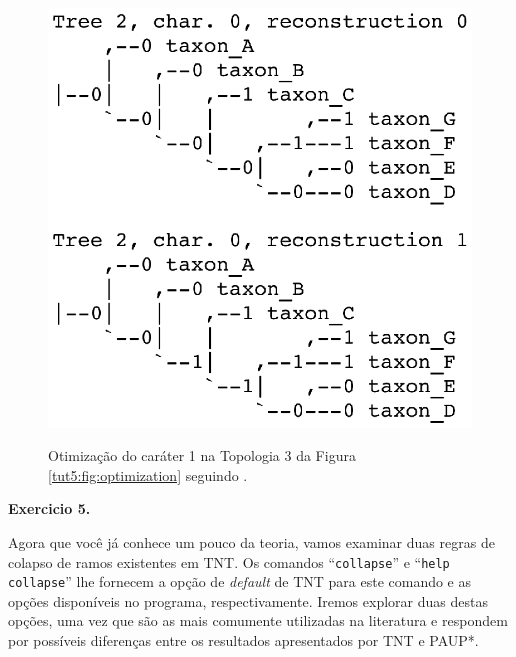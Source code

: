 \begin{refsection}
  \begin{figure}[H]
       \centering
      {\includegraphics[scale=0.70]{figures/tut5/reconstrucao_tnt.eps}}
	{\caption[\textcite{Coddington_and_Scharff_1994} reconstrução]{Otimização do caráter 1 na Topologia 3 da Figura \ref{tut5:fig:optimization} seguindo \textcite{Coddington_and_Scharff_1994}.}\label{tut5:fig:recons}} 
  \end{figure}


\begin{blackBlock}{\textbf{Exercicio 5.}}\label{tut4:ex:5.3}

Agora que você já conhece um pouco da teoria, vamos examinar duas regras de colapso de ramos existentes em TNT. Os comandos ``\texttt{collapse}'' e ``\texttt{help collapse}'' lhe fornecem a opção de \textit{default} de TNT para este comando e as opções disponíveis no programa, respectivamente. Iremos explorar duas destas opções, uma vez que são as mais comumente utilizadas na literatura e respondem por possíveis diferenças entre os resultados apresentados por TNT e PAUP*.


\end{blackBlock}
\end{refsection}
